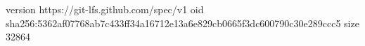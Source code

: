version https://git-lfs.github.com/spec/v1
oid sha256:5362af07768ab7c433ff34a16712e13a6e829cb0665f3dc600790c30e289ccc5
size 32864
